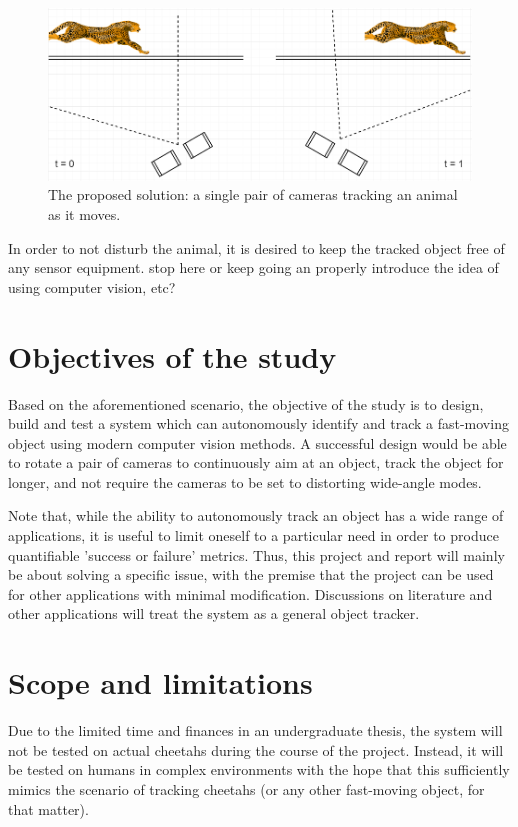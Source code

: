 \begin{figure}[h!]
  \centering
  \includegraphics[width=\textwidth]{single_gopro_pair}
  \caption{\label{fig:single_gopro_pair} The proposed solution: a single pair of cameras tracking an animal as it moves.}
\end{figure}

In order to not disturb the animal, it is desired to keep the tracked object free of any sensor equipment. {\color{red} stop here or keep going an properly introduce the idea of using computer vision, etc?}

\section{Objectives of the study}
Based on the aforementioned scenario, the objective of the study is to design, build and test a system which can autonomously identify and track a fast-moving object using modern computer vision methods. A successful design would be able to rotate a pair of cameras to continuously aim at an object, track the object for longer, and not require the cameras to be set to distorting wide-angle modes.

Note that, while the ability to autonomously track an object has a wide range of applications, it is useful to limit oneself to a particular need in order to produce quantifiable 'success or failure' metrics. Thus, this project and report will mainly be about solving a specific issue, with the premise that the project can be used for other applications with minimal modification. Discussions on literature and other applications will treat the system as a general object tracker.


\section{Scope and limitations}
Due to the limited time and finances in an undergraduate thesis, the system will not be tested on actual cheetahs during the course of the project. Instead, it will be tested on humans in complex environments with the hope that this sufficiently mimics the scenario of tracking cheetahs (or any other fast-moving object, for that matter).

